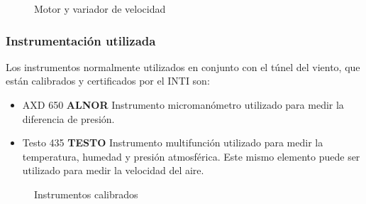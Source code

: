 \begin{figure}[htb]
	\centering
	\label{fig:motorr}
	\hfill
	\label{fig:LS650}
	\caption{Motor y variador de velocidad} 
	
\end{figure}



		
	\subsubsection{Instrumentación utilizada}
	Los instrumentos normalmente utilizados en conjunto con el túnel del viento, que están calibrados y certificados por el INTI son:
\begin{itemize}
	\item AXD 650 \textbf{ALNOR} 
		\subitem Instrumento micromanómetro utilizado para medir la diferencia de presión.
	\item Testo 435 \textbf{TESTO}
	\subitem Instrumento multifunción utilizado para medir la temperatura, humedad y presión atmosférica. Este mismo elemento puede ser utilizado para medir la velocidad del aire.
	
\end{itemize}	   		
		
\begin{figure}[htbp]
	\centering
	\caption{Instrumentos calibrados} \label{fig:instr}
\end{figure}		
		
		
		\newpage
